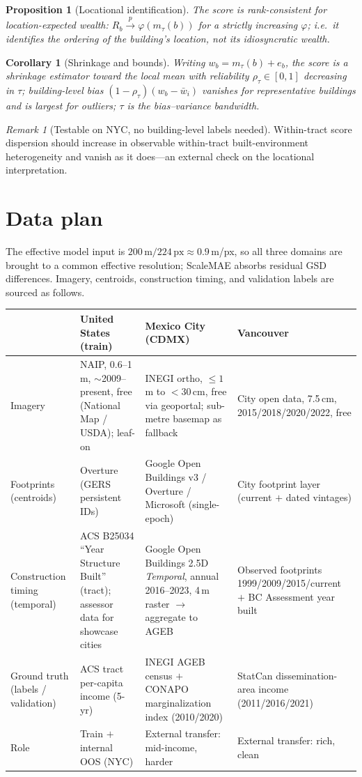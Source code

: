 \documentclass[11pt]{article}
\theoremstyle{plain}
\newtheorem{proposition}{Proposition}
\newtheorem{corollary}{Corollary}
\theoremstyle{remark}
\newtheorem{remark}{Remark}
\newcommand{\pto}{\xrightarrow{p}}
\begin{document}
\begin{proposition}[Locational identification]
The score is rank-consistent for location-expected wealth:
$R_b\pto\varphi(m_\tau(b))$ for a strictly increasing $\varphi$; i.e.\ it identifies
the ordering of the building's \emph{location}, not its idiosyncratic wealth.
\end{proposition}
\begin{corollary}[Shrinkage and bounds]
Writing $w_b=m_\tau(b)+e_b$, the score is a shrinkage estimator toward the local
mean with reliability $\rho_\tau\in[0,1]$ decreasing in $\tau$; building-level bias
$(1-\rho_\tau)(w_b-\bar w_i)$ vanishes for representative buildings and is largest
for outliers; $\tau$ is the bias--variance bandwidth.
\end{corollary}
\begin{remark}[Testable on NYC, no building-level labels needed]
Within-tract score dispersion should increase in observable within-tract
built-environment heterogeneity and vanish as it does---an external check on the
locational interpretation.
\end{remark}

\section{Data plan}
The effective model input is $200\,\mathrm{m}/224\,\mathrm{px}\approx 0.9\,$m/px, so
all three domains are brought to a common effective resolution; ScaleMAE absorbs
residual GSD differences. Imagery, centroids, construction timing, and validation
labels are sourced as follows.

\begin{table}[h]
\centering\footnotesize
\begin{tabular}{P{2.2cm} P{3.7cm} P{3.7cm} P{3.7cm}}
\toprule
 & \textbf{United States (train)} & \textbf{Mexico City (CDMX)} & \textbf{Vancouver} \\
\midrule
Imagery &
NAIP, 0.6--1\,m, $\sim$2009--present, free (National Map / USDA); leaf-on &
INEGI ortho, $\le 1$\,m to $<\!30$\,cm, free via geoportal; sub-metre basemap as fallback &
City open data, 7.5\,cm, 2015/2018/2020/2022, free \\[0.4em]
Footprints (centroids) &
Overture (GERS persistent IDs) &
Google Open Buildings v3 / Overture / Microsoft (single-epoch) &
City footprint layer (current $+$ dated vintages) \\[0.4em]
Construction timing (temporal) &
ACS B25034 ``Year Structure Built'' (tract); assessor data for showcase cities &
Google Open Buildings 2.5D \emph{Temporal}, annual 2016--2023, 4\,m raster $\to$ aggregate to AGEB &
Observed footprints 1999/2009/2015/current $+$ BC Assessment year built \\[0.4em]
Ground truth (labels / validation) &
ACS tract per-capita income (5-yr) &
INEGI AGEB census $+$ CONAPO marginalization index (2010/2020) &
StatCan dissemination-area income (2011/2016/2021) \\[0.4em]
Role &
Train $+$ internal OOS (NYC) &
External transfer: mid-income, harder &
External transfer: rich, clean \\
\bottomrule
\end{tabular}
\end{table}
\end{document}
